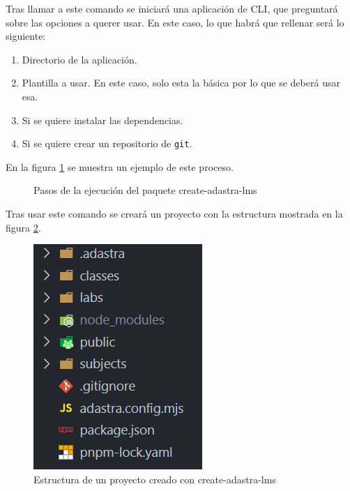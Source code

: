 Tras llamar a este comando se iniciará una aplicación de CLI, que preguntará sobre las opciones a querer usar. En este caso, lo que habrá que rellenar será lo siguiente:

\begin{enumerate}
    \item Directorio de la aplicación.
    \item Plantilla a usar. En este caso, solo esta la básica por lo que se deberá usar esa.
    \item Si se quiere instalar las dependencias.
    \item Si se quiere crear un repositorio de \verb|git|\cite{git}.
\end{enumerate}

En la figura \ref{fig:create-adastra} se  muestra un ejemplo de este proceso.

\begin{figure}
    \centering
    \caption{Pasos de la ejecución del paquete create-adastra-lms}
    \label{fig:create-adastra}
\end{figure}

Tras usar este comando se creará un proyecto con la estructura mostrada en la figura \ref{fig:adastra-structure}.

\begin{figure}[H]
    \centering
    \includegraphics{images/projectStructure.png}
    \caption{Estructura de un proyecto creado con create-adastra-lms}
    \label{fig:adastra-structure}
\end{figure}

